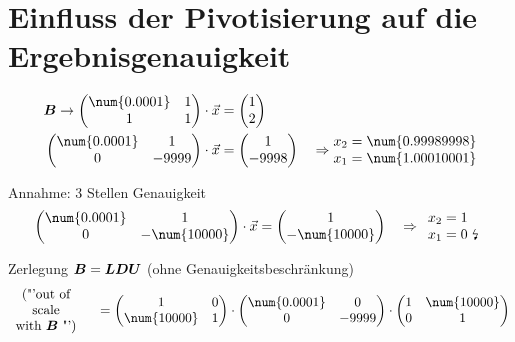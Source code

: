 \section{Einfluss der Pivotisierung auf die Ergebnisgenauigkeit}
\begin{align}
	\ma{B}\rightarrow\begin{pmatrix}
	\num{0.0001} & 1 \\ 1 & 1
	\end{pmatrix}\cdot\vec{x} &= \begin{pmatrix}
	1\\ 2
	\end{pmatrix}\\
	\begin{pmatrix}
	\num{0.0001} & 1 \\ 0 & -9999
	\end{pmatrix}\cdot\vec{x} &= \begin{pmatrix}
	1\\ -9998
	\end{pmatrix}\quad\Rightarrow\begin{matrix}
	x_2 = \num{0.99989998}\\ x_1 = \num{1.00010001}
	\end{matrix}
\end{align}

Annahme: 3 Stellen Genauigkeit
\begin{align}
	\begin{pmatrix}
	\num{0.0001} & 1 \\ 0 & -\num{10000}
	\end{pmatrix}\cdot\vec{x} = \begin{pmatrix}
	1\\ -\num{10000}
	\end{pmatrix}\quad\Rightarrow\begin{array}{l}
	x_2 = 1\\ x_1 = 0\text{ \lightning}
	\end{array}
\end{align}

Zerlegung $\boldsymbol {B} = \boldsymbol {L}\boldsymbol {D}\boldsymbol {U}$ (ohne Genauigkeitsbeschränkung)
\begin{align}
	\begin{array}{c}
	\text{("'out of}\\ \text{scale}\\ \text{with }\ma{B}\text{ "')}
	\end{array}\quad = \begin{pmatrix}
	1 & 0 \\ 
	\num{10000} & 1
	\end{pmatrix}\cdot\begin{pmatrix}
	\num{0.0001} & 0 \\ 0 & -9999
	\end{pmatrix}\cdot\begin{pmatrix}
	1 & \num{10000} \\ 
	0 & 1
	\end{pmatrix}
\end{align}

